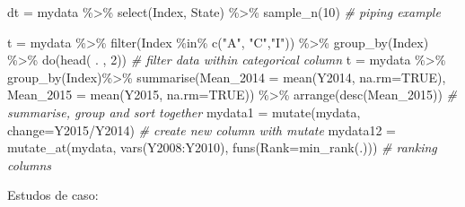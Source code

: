 \documentclass[
]{article}
\newenvironment{Shaded}{\begin{snugshade}}{\end{snugshade}}
\newcommand{\AttributeTok}[1]{\textcolor[rgb]{0.77,0.63,0.00}{#1}}
\newcommand{\CommentTok}[1]{\textcolor[rgb]{0.56,0.35,0.01}{\textit{#1}}}
\newcommand{\ConstantTok}[1]{\textcolor[rgb]{0.00,0.00,0.00}{#1}}
\newcommand{\DecValTok}[1]{\textcolor[rgb]{0.00,0.00,0.81}{#1}}
\newcommand{\FunctionTok}[1]{\textcolor[rgb]{0.00,0.00,0.00}{#1}}
\newcommand{\NormalTok}[1]{#1}
\newcommand{\OtherTok}[1]{\textcolor[rgb]{0.56,0.35,0.01}{#1}}
\newcommand{\SpecialCharTok}[1]{\textcolor[rgb]{0.00,0.00,0.00}{#1}}
\newcommand{\StringTok}[1]{\textcolor[rgb]{0.31,0.60,0.02}{#1}}
\begin{document}
\begin{Shaded}
\begin{Highlighting}[]
\NormalTok{dt }\OtherTok{=}\NormalTok{ mydata }\SpecialCharTok{\%\textgreater{}\%} \FunctionTok{select}\NormalTok{(Index, State) }\SpecialCharTok{\%\textgreater{}\%} \FunctionTok{sample\_n}\NormalTok{(}\DecValTok{10}\NormalTok{) }\CommentTok{\# piping example}
\end{Highlighting}
\end{Shaded}

\begin{Shaded}
\begin{Highlighting}[]
\NormalTok{t }\OtherTok{=}\NormalTok{ mydata }\SpecialCharTok{\%\textgreater{}\%} \FunctionTok{filter}\NormalTok{(Index }\SpecialCharTok{\%in\%} \FunctionTok{c}\NormalTok{(}\StringTok{"A"}\NormalTok{, }\StringTok{"C"}\NormalTok{,}\StringTok{"I"}\NormalTok{)) }\SpecialCharTok{\%\textgreater{}\%} \FunctionTok{group\_by}\NormalTok{(Index) }\SpecialCharTok{\%\textgreater{}\%} \FunctionTok{do}\NormalTok{(}\FunctionTok{head}\NormalTok{( . , }\DecValTok{2}\NormalTok{)) }\CommentTok{\# filter data within categorical column}
\NormalTok{t }\OtherTok{=}\NormalTok{ mydata }\SpecialCharTok{\%\textgreater{}\%} \FunctionTok{group\_by}\NormalTok{(Index)}\SpecialCharTok{\%\textgreater{}\%} \FunctionTok{summarise}\NormalTok{(}\AttributeTok{Mean\_2014 =} \FunctionTok{mean}\NormalTok{(Y2014, }\AttributeTok{na.rm=}\ConstantTok{TRUE}\NormalTok{), }\AttributeTok{Mean\_2015 =} \FunctionTok{mean}\NormalTok{(Y2015, }\AttributeTok{na.rm=}\ConstantTok{TRUE}\NormalTok{)) }\SpecialCharTok{\%\textgreater{}\%} \FunctionTok{arrange}\NormalTok{(}\FunctionTok{desc}\NormalTok{(Mean\_2015)) }\CommentTok{\# summarise, group and sort together}
\NormalTok{mydata1 }\OtherTok{=} \FunctionTok{mutate}\NormalTok{(mydata, }\AttributeTok{change=}\NormalTok{Y2015}\SpecialCharTok{/}\NormalTok{Y2014) }\CommentTok{\# create new column with mutate}
\NormalTok{mydata12 }\OtherTok{=} \FunctionTok{mutate\_at}\NormalTok{(mydata, }\FunctionTok{vars}\NormalTok{(Y2008}\SpecialCharTok{:}\NormalTok{Y2010), }\FunctionTok{funs}\NormalTok{(}\AttributeTok{Rank=}\FunctionTok{min\_rank}\NormalTok{(.))) }\CommentTok{\# ranking columns}
\end{Highlighting}
\end{Shaded}

Estudos de caso:
\end{document}
